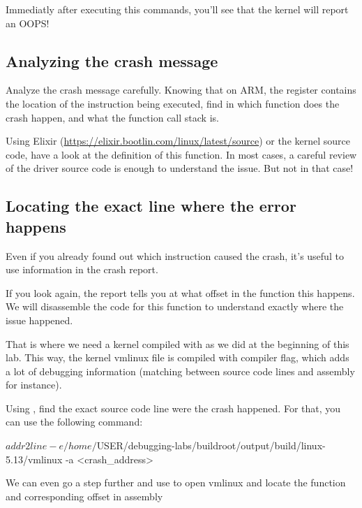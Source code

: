
Immediatly after executing this commands, you'll see that the kernel will report
an OOPS!

\subsection{Analyzing the crash message}

Analyze the crash message carefully. Knowing that on ARM, the 
register contains the location of the instruction being executed, find
in which function does the crash happen, and what the function call
stack is.

Using Elixir (\url{https://elixir.bootlin.com/linux/latest/source}) or the
kernel source code, have a look at the definition of this function. In most
cases, a careful review of the driver source code is enough to understand the
issue. But not in that case!

\subsection{Locating the exact line where the error happens}

Even if you already found out which instruction caused the crash, it's
useful to use information in the crash report.

If you look again, the report tells you at what offset in the function
this happens. We will disassemble the code for this function to understand
exactly where the issue happened.

That is where we need a kernel compiled with 
as we did at the beginning of this lab. This way, the kernel vmlinux file is
compiled with  compiler flag, which adds a lot of debugging
information (matching between source code lines and assembly for instance).

Using , find the exact source code line were the crash happened.
For that, you can use the following command:

\begin{bashinput}
$ addr2line -e /home/$USER/debugging-labs/buildroot/output/build/linux-5.13/vmlinux
  -a <crash_address>
\end{bashinput}

We can even go a step further and use  to open vmlinux and
locate the function and corresponding offset in assembly

